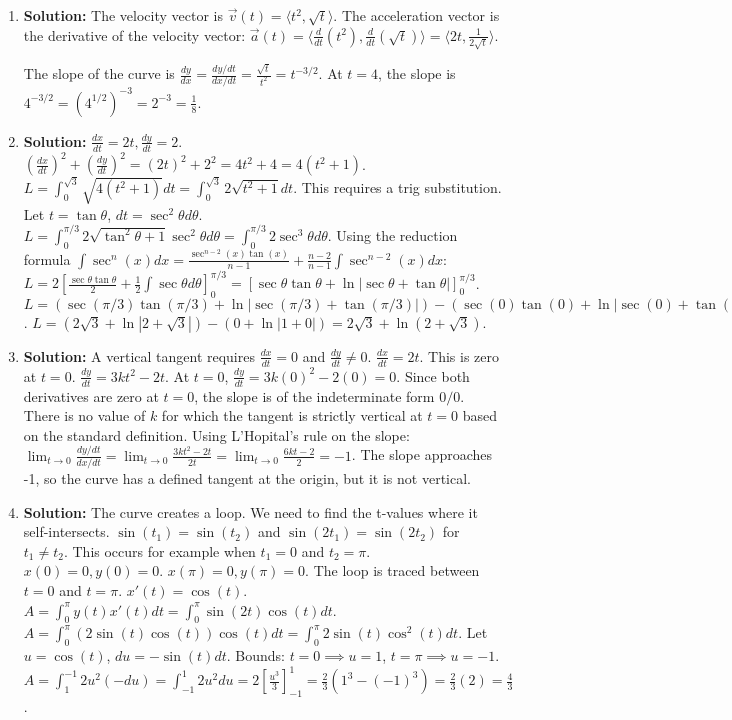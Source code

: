 \documentclass{article}
\begin{document}
\begin{enumerate}
\item \textbf{Solution:} The velocity vector is $\vec{v}(t) = \langle t^2, \sqrt{t} \rangle$.
The acceleration vector is the derivative of the velocity vector:
$\vec{a}(t) = \langle \frac{d}{dt}(t^2), \frac{d}{dt}(\sqrt{t}) \rangle = \langle 2t, \frac{1}{2\sqrt{t}} \rangle$.

The slope of the curve is $\frac{dy}{dx} = \frac{dy/dt}{dx/dt} = \frac{\sqrt{t}}{t^2} = t^{-3/2}$.
At $t=4$, the slope is $4^{-3/2} = (4^{1/2})^{-3} = 2^{-3} = \frac{1}{8}$.

\item \textbf{Solution:}
$\frac{dx}{dt}=2t, \frac{dy}{dt}=2$.
$(\frac{dx}{dt})^2+(\frac{dy}{dt})^2 = (2t)^2 + 2^2 = 4t^2+4 = 4(t^2+1)$.
$L = \int_0^{\sqrt{3}} \sqrt{4(t^2+1)} dt = \int_0^{\sqrt{3}} 2\sqrt{t^2+1} dt$.
This requires a trig substitution. Let $t=\tan\theta$, $dt=\sec^2\theta d\theta$.
$L = \int_0^{\pi/3} 2\sqrt{\tan^2\theta+1}\sec^2\theta d\theta = \int_0^{\pi/3} 2\sec^3\theta d\theta$.
Using the reduction formula $\int \sec^n(x)dx = \frac{\sec^{n-2}(x)\tan(x)}{n-1} + \frac{n-2}{n-1}\int \sec^{n-2}(x)dx$:
$L = 2 \left[ \frac{\sec\theta\tan\theta}{2} + \frac{1}{2}\int \sec\theta d\theta \right]_0^{\pi/3} = [\sec\theta\tan\theta + \ln|\sec\theta+\tan\theta|]_0^{\pi/3}$.
$L = (\sec(\pi/3)\tan(\pi/3) + \ln|\sec(\pi/3)+\tan(\pi/3)|) - (\sec(0)\tan(0) + \ln|\sec(0)+\tan(0)|)$.
$L = (2\sqrt{3} + \ln|2+\sqrt{3}|) - (0 + \ln|1+0|) = 2\sqrt{3} + \ln(2+\sqrt{3})$.

\item \textbf{Solution:} A vertical tangent requires $\frac{dx}{dt}=0$ and $\frac{dy}{dt} \neq 0$.
$\frac{dx}{dt} = 2t$. This is zero at $t=0$.
$\frac{dy}{dt} = 3kt^2 - 2t$.
At $t=0$, $\frac{dy}{dt} = 3k(0)^2 - 2(0) = 0$.
Since both derivatives are zero at $t=0$, the slope is of the indeterminate form $0/0$. There is no value of $k$ for which the tangent is strictly vertical at $t=0$ based on the standard definition. Using L'Hopital's rule on the slope:
$\lim_{t\to 0} \frac{dy/dt}{dx/dt} = \lim_{t\to 0} \frac{3kt^2-2t}{2t} = \lim_{t\to 0} \frac{6kt-2}{2} = -1$.
The slope approaches -1, so the curve has a defined tangent at the origin, but it is not vertical.

\item \textbf{Solution:} The curve creates a loop. We need to find the t-values where it self-intersects.
$\sin(t_1)=\sin(t_2)$ and $\sin(2t_1)=\sin(2t_2)$ for $t_1 \neq t_2$.
This occurs for example when $t_1=0$ and $t_2=\pi$.
$x(0)=0, y(0)=0$. $x(\pi)=0, y(\pi)=0$. The loop is traced between $t=0$ and $t=\pi$.
$x'(t) = \cos(t)$.
$A = \int_0^\pi y(t)x'(t) dt = \int_0^\pi \sin(2t)\cos(t) dt$.
$A = \int_0^\pi (2\sin(t)\cos(t))\cos(t) dt = \int_0^\pi 2\sin(t)\cos^2(t) dt$.
Let $u=\cos(t)$, $du=-\sin(t)dt$.
Bounds: $t=0 \implies u=1$, $t=\pi \implies u=-1$.
$A = \int_1^{-1} 2u^2 (-du) = \int_{-1}^1 2u^2 du = 2[\frac{u^3}{3}]_{-1}^1 = \frac{2}{3}(1^3 - (-1)^3) = \frac{2}{3}(2) = \frac{4}{3}$.


\end{enumerate}
\end{document}
